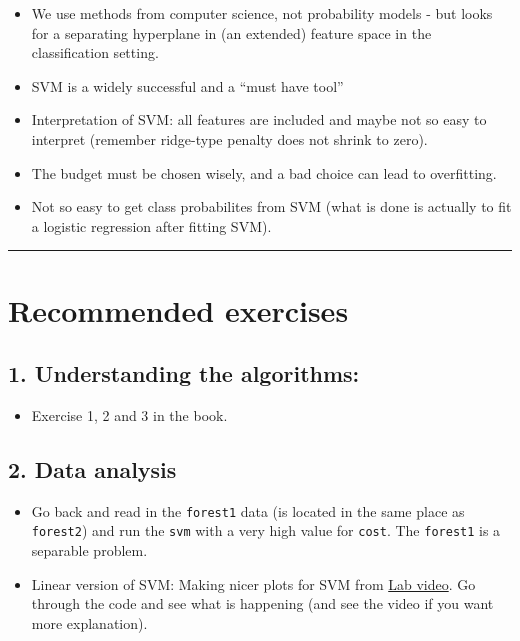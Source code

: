 \documentclass[]{article}
\providecommand{\tightlist}{%
  \setlength{\itemsep}{0pt}\setlength{\parskip}{0pt}}
\begin{document}
\begin{itemize}
\tightlist
\item
  We use methods from computer science, not probability models - but
  looks for a separating hyperplane in (an extended) feature space in
  the classification setting.
\item
  SVM is a widely successful and a ``must have tool''
\item
  Interpretation of SVM: all features are included and maybe not so easy
  to interpret (remember ridge-type penalty does not shrink to zero).
\item
  The budget must be chosen wisely, and a bad choice can lead to
  overfitting.
\item
  Not so easy to get class probabilites from SVM (what is done is
  actually to fit a logistic regression after fitting SVM).
\end{itemize}

\begin{center}\rule{0.5\linewidth}{\linethickness}\end{center}

\hypertarget{recommended-exercises}{%
\section{Recommended exercises}\label{recommended-exercises}}

\hypertarget{understanding-the-algorithms}{%
\subsection{1. Understanding the
algorithms:}\label{understanding-the-algorithms}}

\begin{itemize}
\tightlist
\item
  Exercise 1, 2 and 3 in the book.
\end{itemize}

\hypertarget{data-analysis}{%
\subsection{2. Data analysis}\label{data-analysis}}

\begin{itemize}
\item
  Go back and read in the \texttt{forest1} data (is located in the same
  place as \texttt{forest2}) and run the \texttt{svm} with a very high
  value for \texttt{cost}. The \texttt{forest1} is a separable problem.
\item
  Linear version of SVM: Making nicer plots for SVM from
  \href{https://www.youtube.com/watch?v=qhyyufR0930\&list=PL5-da3qGB5IDl6MkmovVdZwyYOhpCxo5o\&index=5}{Lab
  video}. Go through the code and see what is happening (and see the
  video if you want more explanation).
\end{itemize}
\end{document}
